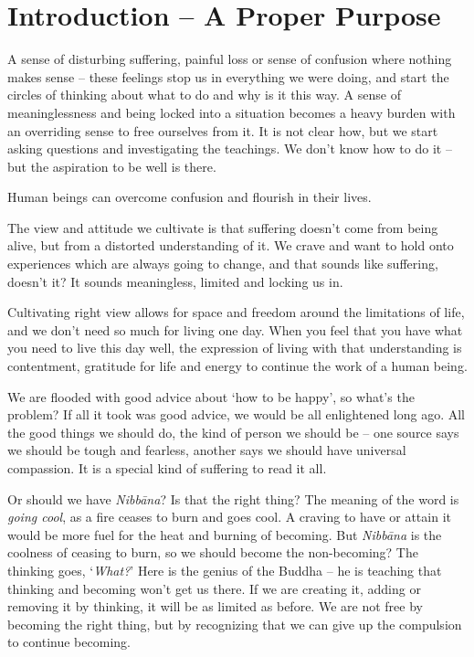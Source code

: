 \hypertarget{introduction}{%
\chapter{Introduction -- A Proper Purpose}\label{introduction}}

A sense of disturbing suffering, painful loss or sense of confusion
where nothing makes sense -- these feelings stop us in everything we
were doing, and start the circles of thinking about what to do and why
is it this way. A sense of meaninglessness and being locked into a
situation becomes a heavy burden with an overriding sense to free
ourselves from it. It is not clear how, but we start asking questions
and investigating the teachings. We don't know how to do it -- but the
aspiration to be well is there.

Human beings can overcome confusion and flourish in their lives.

The view and attitude we cultivate is that suffering doesn't come from
being alive, but from a distorted understanding of it. We crave and want
to hold onto experiences which are always going to change, and that
sounds like suffering, doesn't it? It sounds meaningless, limited and
locking us in.

Cultivating right view allows for space and freedom around the
limitations of life, and we don't need so much for living one day. When
you feel that you have what you need to live this day well, the
expression of living with that understanding is contentment, gratitude
for life and energy to continue the work of a human being.

We are flooded with good advice about `how to be happy', so what's the
problem? If all it took was good advice, we would be all enlightened
long ago. All the good things we should do, the kind of person we should
be -- one source says we should be tough and fearless, another says we
should have universal compassion. It is a special kind of suffering to
read it all.

Or should we have \emph{Nibbāna}? Is that the right thing? The meaning
of the word is \emph{going cool}, as a fire ceases to burn and goes
cool. A craving to have or attain it would be more fuel for the heat and
burning of becoming. But \emph{Nibbāna} is the coolness of ceasing to
burn, so we should become the non-becoming? The thinking goes,
`\emph{What?}' Here is the genius of the Buddha -- he is teaching that
thinking and becoming won't get us there. If we are creating it, adding
or removing it by thinking, it will be as limited as before. We are not
free by becoming the right thing, but by recognizing that we can give up
the compulsion to continue becoming.

